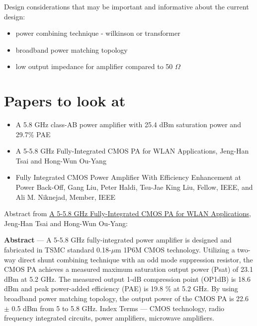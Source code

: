 \documentclass{article}
\begin{document}
Design considerations that may be important and informative about the current design:

\begin{itemize}
	\item power combining technique - wilkinson or transformer %
	\item broadband power matching topology %
	\item low output impedance for amplifier compared to 50 $\Omega$
\end{itemize}

\section{Papers to look at}

\begin{itemize}
	\item A 5.8 GHz class-AB power amplifier with 25.4 dBm saturation power and 29.7\% PAE
	\item A 5-5.8 GHz Fully-Integrated CMOS PA for WLAN Applications, Jeng-Han Tsai and Hong-Wun Ou-Yang
	\item Fully Integrated CMOS Power Amplifier With Efficiency Enhancement at Power Back-Off, Gang Liu, Peter Haldi, Tsu-Jae King Liu, Fellow, IEEE, and Ali M. Niknejad, Member, IEEE
\end{itemize}

Abstract from \href{https://ieeexplore.ieee.org/document/6830155}{A 5-5.8 GHz Fully-Integrated CMOS PA for WLAN Applications}, Jeng-Han Tsai and Hong-Wun Ou-Yang:

\begin{info}
	\textbf{Abstract} — A 5-5.8 GHz fully-integrated power amplifier is designed and fabricated in TSMC standard 0.18-$\mu$m 1P6M CMOS technology. Utilizing a two-way direct shunt combining technique with an odd mode suppression resistor, the CMOS PA achieves a measured maximum saturation output power (Psat) of 23.1 dBm at 5.2 GHz. The measured output 1-dB compression point (OP1dB) is 18.6 dBm and peak power-added efficiency (PAE) is 19.8 \% at 5.2 GHz. By using broadband power matching topology, the output power of the CMOS PA is 22.6 $\pm$ 0.5 dBm from 5 to 5.8 GHz. Index Terms — CMOS technology, radio frequency integrated circuits, power amplifiers, microwave amplifiers.
\end{info}

\end{document}
